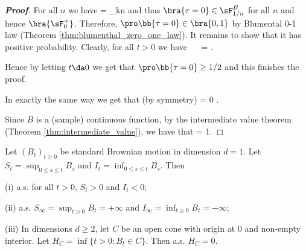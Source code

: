 \begin{proof}[\bf Proof]
For all $n$ we have
\be
{} = \bigcap_{k\geq n} 
\ee
and thus $\bra{\tau = 0} \in \sF^B_{1/n}$ for all $n$ and hence $\bra{\sF^+_0}$. Therefore, $\pro\bb{\tau = 0} \in \bra{0,1}$ by Blumental 0-1 law (Theorem \ref{thm:blumenthal_zero_one_law}). It remains to show that it has positive probability. Clearly, for all $t>0$ we have
\be
\pro{} \geq \pro{} \leq \pro{} \ \ra \ \pro{} \geq \pro{} = .
\ee

Hence by letting $t\da 0$ we get that $\pro\bb{\tau = 0} \geq 1/2$ and this finishes the proof.

In exactly the same way we get that (by symmetry)
\be
\inf{} = 0 .
\ee

Since $B$ is a (sample) continuous function, by the intermediate value theorem (Theorem \ref{thm:intermediate_value}), we have that
\be
\pro{} = 1.
\ee
\end{proof}


\begin{proposition}\label{pro:brownian_motion_limit_value}
Let $(B_t)_{t \geq 0}$ be standard Brownian motion in dimension $d = 1$. Let $S_t = \sup_{0\leq s \leq t} B_s$ and $I_t = \inf_{0\leq s\leq t} B_s$. Then
\ben
\item [(i)] a.s. for all $t > 0$, $S_t > 0$ and $I_t < 0$;
\item [(ii)] a.s. $S_\infty = \sup_{t\geq 0} B_t = +\infty$ and $I_\infty = \inf_{t\geq 0} B_t = -\infty$;
\item [(iii)] In dimensions $d \geq 2$, let $C$ be an open cone with origin at 0 and non-empty interior. Let $H_C = \inf\{t > 0: B_t \in C\}$. Then a.s. $H_C = 0$.
\een
\end{proposition}

